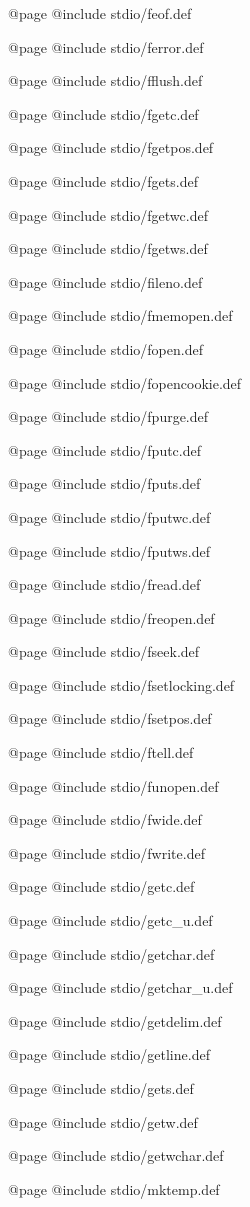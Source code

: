 @page
@include stdio/feof.def

@page
@include stdio/ferror.def

@page
@include stdio/fflush.def

@page
@include stdio/fgetc.def

@page
@include stdio/fgetpos.def

@page
@include stdio/fgets.def

@page
@include stdio/fgetwc.def

@page
@include stdio/fgetws.def

@page
@include stdio/fileno.def

@page
@include stdio/fmemopen.def

@page
@include stdio/fopen.def

@page
@include stdio/fopencookie.def

@page
@include stdio/fpurge.def

@page
@include stdio/fputc.def

@page
@include stdio/fputs.def

@page
@include stdio/fputwc.def

@page
@include stdio/fputws.def

@page
@include stdio/fread.def

@page
@include stdio/freopen.def

@page
@include stdio/fseek.def

@page
@include stdio/fsetlocking.def

@page
@include stdio/fsetpos.def

@page
@include stdio/ftell.def

@page
@include stdio/funopen.def

@page
@include stdio/fwide.def

@page
@include stdio/fwrite.def

@page
@include stdio/getc.def

@page
@include stdio/getc_u.def

@page
@include stdio/getchar.def

@page
@include stdio/getchar_u.def

@page
@include stdio/getdelim.def

@page
@include stdio/getline.def

@page
@include stdio/gets.def

@page
@include stdio/getw.def

@page
@include stdio/getwchar.def

@page
@include stdio/mktemp.def

